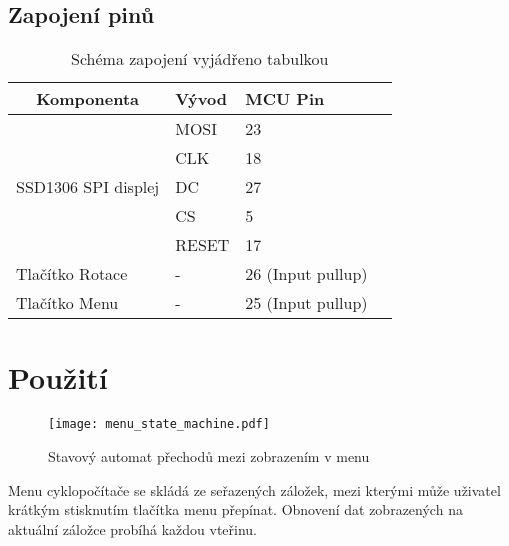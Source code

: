 \documentclass[twocolumn,a4paper,10pt]{article}
\begin{document}
\subsection{Zapojení pinů}\label{sec:pins}

\begin{center}
    \begin{table}[h]
        \begin{tabular}{|c|l|l|l|}
            \hline
            Komponenta                            & Vývod            & MCU Pin\\ \hline
            \multirow{5}{*}{SSD1306 SPI displej}  & MOSI             & 23  \\ 
                                                  & CLK              & 18  \\ 
                                                  & DC               & 27  \\ 
                                                  & CS               & 5   \\ 
                                                  & RESET            & 17  \\ \hline
            \multicolumn{1}{|l|}{Tlačítko Rotace} & -                & 26  (Input pullup) \\ \hline
            \multicolumn{1}{|l|}{Tlačítko Menu}   & -                & 25  (Input pullup) \\ \hline
        \end{tabular}
        \caption{Schéma zapojení vyjádřeno tabulkou}
        \label{table:schematics}
    \end{table}
\end{center}

\section{Použití}
\begin{center}
    \begin{figure}[h]
        \centering
        \texttt{[image: menu\_state\_machine.pdf]}
        \caption{Stavový automat přechodů mezi zobrazením v menu}
        \label{fig:menu_FSM}
    \end{figure}
\end{center}
Menu cyklopočítače se skládá ze seřazených záložek, mezi kterými může uživatel krátkým stisknutím tlačítka menu přepínat. Obnovení dat zobrazených na aktuální záložce probíhá každou vteřinu.
\end{document}

